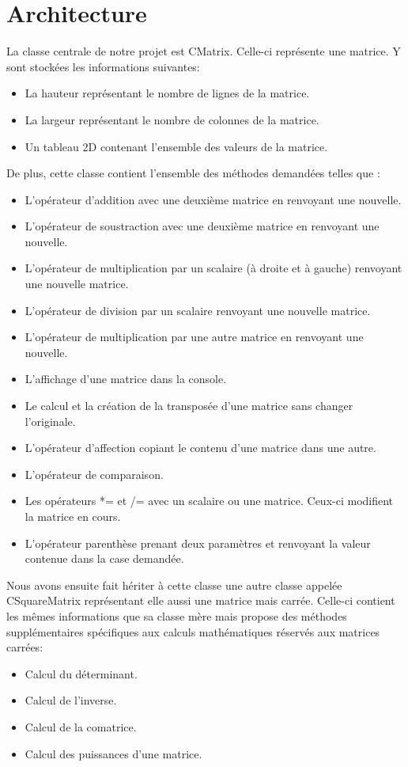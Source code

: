 	\chapter{Architecture}
		La classe centrale de notre projet est CMatrix. Celle-ci représente une matrice. Y sont stockées les informations suivantes:
		\begin{itemize}
			\item La hauteur représentant le nombre de lignes de la matrice.
			\item La largeur représentant le nombre de colonnes de la matrice.
			\item Un tableau 2D contenant l'ensemble des valeurs de la matrice.\\
		\end{itemize}
		De plus, cette classe contient l'ensemble des méthodes demandées telles que :
		\begin{itemize}
			\item L'opérateur d'addition avec une deuxième matrice en renvoyant une nouvelle.
			\item L'opérateur de soustraction avec une deuxième matrice en renvoyant une nouvelle.
			\item L'opérateur de multiplication par un scalaire (à droite et à gauche) renvoyant une nouvelle matrice.
			\item L'opérateur de division par un scalaire renvoyant une nouvelle matrice.
			\item L'opérateur de multiplication par une autre matrice en renvoyant une nouvelle.
			\item L'affichage d'une matrice dans la console.
			\item Le calcul et la création de la transposée d'une matrice sans changer l'originale.
			\item L'opérateur d'affection copiant le contenu d'une matrice dans une autre.
			\item L'opérateur de comparaison.
			\item Les opérateurs *= et /= avec un scalaire ou une matrice. Ceux-ci modifient la matrice en cours.
			\item L'opérateur parenthèse prenant deux paramètres et renvoyant la valeur contenue dans la case demandée.\\
		\end{itemize}
		
		Nous avons ensuite fait hériter à cette classe une autre classe appelée CSquareMatrix représentant elle aussi une matrice mais carrée. Celle-ci contient les mêmes informations que sa classe mère mais propose des méthodes supplémentaires spécifiques aux calculs mathématiques réservés aux matrices carrées:
		\begin{itemize}
			\item Calcul du déterminant.
			\item Calcul de l'inverse.
			\item Calcul de la comatrice.
			\item Calcul des puissances d'une matrice.\\
		\end{itemize}
		
